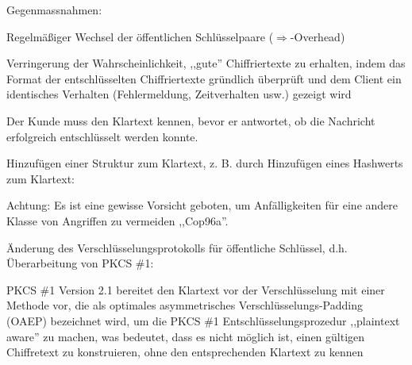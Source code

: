 \documentclass[a4paper]{article}
\begin{document}
\begin{multicols}{3}
\begin{itemize*}
            \item Gegenmassnahmen:
            \begin{itemize*}
                  \item Regelmäßiger Wechsel der öffentlichen Schlüsselpaare ($\Rightarrow$-Overhead)
                  \item Verringerung der Wahrscheinlichkeit, ,,gute'' Chiffriertexte zu erhalten, indem das Format der entschlüsselten Chiffriertexte gründlich überprüft und dem Client ein identisches Verhalten (Fehlermeldung, Zeitverhalten usw.) gezeigt wird
                  \item Der Kunde muss den Klartext kennen, bevor er antwortet, ob die Nachricht erfolgreich entschlüsselt werden konnte.
                  \item Hinzufügen einer Struktur zum Klartext, z. B. durch Hinzufügen eines Hashwerts zum Klartext:
                  \begin{itemize*}
                        \item Achtung: Es ist eine gewisse Vorsicht geboten, um Anfälligkeiten für eine andere Klasse von Angriffen zu vermeiden ,,Cop96a''.
                  \end{itemize*}
                  \item Änderung des Verschlüsselungsprotokolls für öffentliche Schlüssel, d.h. Überarbeitung von PKCS \#1:
                  \begin{itemize*}
                        \item PKCS \#1 Version 2.1 bereitet den Klartext vor der Verschlüsselung mit einer Methode vor, die als optimales asymmetrisches Verschlüsselungs-Padding (OAEP) bezeichnet wird, um die PKCS \#1 Entschlüsselungsprozedur ,,plaintext aware'' zu machen, was bedeutet, dass es nicht möglich ist, einen gültigen Chiffretext zu konstruieren, ohne den entsprechenden Klartext zu kennen
                  \end{itemize*}
            \end{itemize*}
      \end{itemize*}


\end{multicols}
\end{document}
